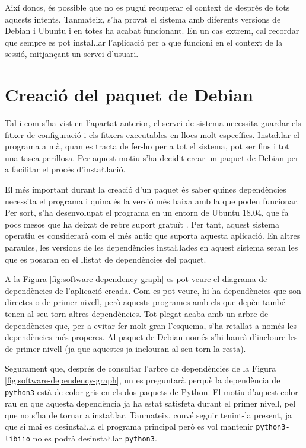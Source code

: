 Així doncs, és possible que no es pugui recuperar el context de 
després de tots aquests intents. Tanmateix, s'ha provat el
sistema amb diferents versions de Debian i Ubuntu i en totes ha acabat funcionant.
En un cas extrem, cal recordar que sempre es pot insta\l.lar l'aplicació per a
que funcioni en el context de la sessió, mitjançant un servei d'usuari.

\section{Creació del paquet de Debian}

Tal i com s'ha vist en l'apartat anterior, el servei de sistema necessita guardar
els fitxer de configuració i els fitxers executables en llocs molt específics.
Insta\l.lar el programa a mà, quan es tracta de fer-ho per a tot el sistema,
pot ser fins i tot una tasca perillosa. Per aquest motiu s'ha decidit crear un
paquet de Debian per a facilitar el procés d'insta\l.lació.

El més important durant la creació d'un paquet és saber quines dependències
necessita el programa i quina és la versió més baixa amb la que poden funcionar.
Per sort, s'ha desenvolupat el programa en un entorn de Ubuntu 18.04, que fa
pocs mesos que ha deixat de rebre suport gratuït \cite{UbuntuSupport}. Per tant,
aquest sistema
operatiu es considerarà com el més antic que suporta aquesta aplicació. En altres
paraules, les versions de les dependències insta\l.lades en aquest sistema seran
les que es posaran en el llistat de dependències del paquet.

A la Figura \ref{fig:software-dependency-graph} es pot veure el diagrama de
dependències de l'aplicació creada. Com es pot veure, hi ha dependències que
son directes o de primer nivell, però aquests programes amb els que depèn també
tenen al seu torn altres dependències. Tot plegat acaba amb un arbre de
dependències que, per a evitar fer molt gran l'esquema, s'ha retallat a només
les dependències més properes. Al paquet de Debian només s'hi haurà d'incloure
les de primer nivell (ja que aquestes ja inclouran al seu torn la resta).



Segurament que, després de consultar l'arbre de dependències de la Figura
\ref{fig:software-dependency-graph}, un es preguntarà perquè la dependència
de \texttt{python3} està de color gris en els dos paquets de Python. El motiu
d'aquest color rau en que aquesta dependència ja ha estat satisfeta durant el
primer nivell, pel que no s'ha de tornar a insta\l.lar. Tanmateix, convé seguir
tenint-la present, ja que si mai es desinsta\l.la el programa principal però es
vol mantenir \texttt{python3-libiio} no es podrà desinsta\l.lar \texttt{python3}.

